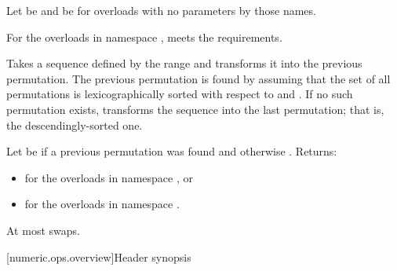 \begin{itemdescr}
\pnum
Let  be 
and  be 
for overloads with no parameters by those names.

\pnum
\expects
For the overloads in namespace ,
 meets
the  requirements.

\pnum
\effects
Takes a sequence defined by the range 
and transforms it into the previous permutation.
The previous permutation is found by assuming that the set of all permutations
is lexicographically sorted with respect to  and .
If no such permutation exists,
transforms the sequence into the last permutation;
that is, the descendingly-sorted one.

\pnum
\returns
Let  be  if a previous permutation was found and
otherwise .
Returns:
\begin{itemize}
\item {} for the overloads in namespace , or
\item {} for the overloads in namespace .
\end{itemize}

\pnum
\complexity
At most  swaps.
\end{itemdescr}

[numeric.ops.overview]{Header  synopsis}

